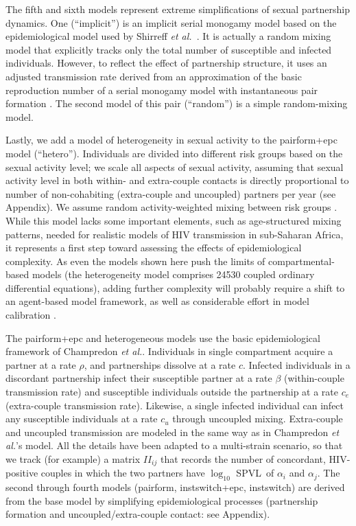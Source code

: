 \documentclass[10pt,letterpaper]{article}
\newcommand{\Lspvl}{$\log_{10}$ SPVL}
\newcommand{\etal}{\textit{et al.}}
\begin{document}
The fifth and sixth models represent extreme simplifications of sexual partnership dynamics.  One (``implicit'') is an implicit serial monogamy model based on the epidemiological model used by Shirreff \etal\ \cite{shirreff_transmission_2011}. It is actually a random mixing model that explicitly tracks only the total number of susceptible and infected individuals. However, to reflect the effect of partnership structure, it uses an adjusted transmission rate derived from an approximation of the basic reproduction number of a serial monogamy model with instantaneous pair formation \cite{hollingsworth_hiv1_2008}. The second model of this pair (``random'') is a simple random-mixing model.

Lastly, we add a model of heterogeneity in sexual activity to the pairform+epc model (``hetero''). Individuals are divided into different risk groups based on the sexual activity level; we scale all aspects of sexual activity, assuming that sexual activity level in both within- and extra-couple contacts is directly proportional to number of non-cohabiting (extra-couple and uncoupled) partners per year \cite{omori2015dynamics} (see Appendix). We assume random activity-weighted mixing between risk groups \cite{may_transmission_1988}. While this model lacks some 
important elements, such as age-structured mixing patterns, needed for realistic models of HIV transmission in sub-Saharan Africa, it represents a first step toward assessing the effects of epidemiological complexity. As even the models shown here push the limits of compartmental-based models (the heterogeneity model comprises 24530 coupled ordinary differential equations), adding further complexity will probably require a shift to an agent-based model framework, as well as considerable effort in model calibration \cite{herbeck_hiv_2014,delva_connecting_2016}.

The pairform+epc and heterogeneous models use the basic epidemiological framework of Champredon \etal \cite{champredon_hiv_2013}. Individuals in single compartment acquire a partner at a rate $\rho$, and partnerships dissolve at a rate $c$. Infected individuals in a discordant partnership infect their susceptible partner at a rate $\beta$ (within-couple transmission rate) and susceptible individuals outside the partnership at a rate $c_e$ (extra-couple transmission rate). Likewise, a single infected individual can infect any susceptible individuals at a rate $c_u$ through uncoupled mixing. Extra-couple and uncoupled transmission are modeled in the same way as in Champredon \etal's model. All the details have been adapted to a multi-strain scenario, so that we track (for example) a matrix 
$II_{ij}$ that records the number of concordant, HIV-positive couples in which the two partners have \Lspvl\ of $\alpha_i$ and $\alpha_j$. 
The second through fourth models (pairform, instswitch+epc, instswitch) are derived from the base model by simplifying epidemiological processes (partnership formation and uncoupled/extra-couple contact: see Appendix).
\end{document}
